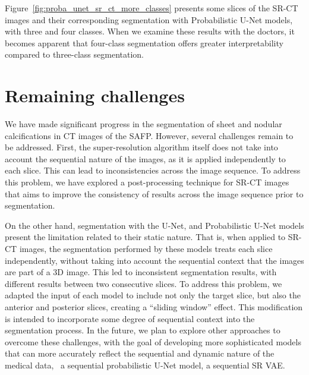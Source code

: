 Figure~\ref{fig:proba_unet_sr_ct_more_classes}
presents some slices of the SR-CT images and their corresponding segmentation
with Probabilistic U-Net models, with three and four classes.
When we examine these results with the doctors, it becomes apparent
that four-class segmentation offers greater interpretability compared to
three-class segmentation.

\section{Remaining challenges}
We have made significant progress in the segmentation of sheet and nodular
calcifications in CT images of the SAFP. However, several challenges remain to
be addressed. First,
the super-resolution algorithm itself does not take into
account the sequential nature of the images, as it is applied independently to
each slice. This can lead to inconsistencies across the image sequence. To
address this problem, we have explored a post-processing technique for SR-CT
images that aims to improve the consistency of results across the image sequence
prior to segmentation.

On the other hand, segmentation with the U-Net, and Probabilistic U-Net models
present the limitation related to their static nature. That is, when applied to
SR-CT images, the segmentation performed by these models
treats each slice independently, without taking into account the sequential
context that the images are part of a 3D image. This led to inconsistent
segmentation results, with  different results between two
consecutive slices. To address this problem, we adapted the input of each
model to include not only the target slice, but also the anterior and posterior
slices, creating a ``sliding window'' effect. This modification is intended to
incorporate some degree of sequential context into the segmentation process.
In the future, we plan to explore other approaches to overcome these challenges,
with the goal of developing more sophisticated models that can more accurately
reflect the sequential and dynamic nature of the medical data, 
\eg~a sequential probabilistic U-Net model, a sequential SR VAE.




